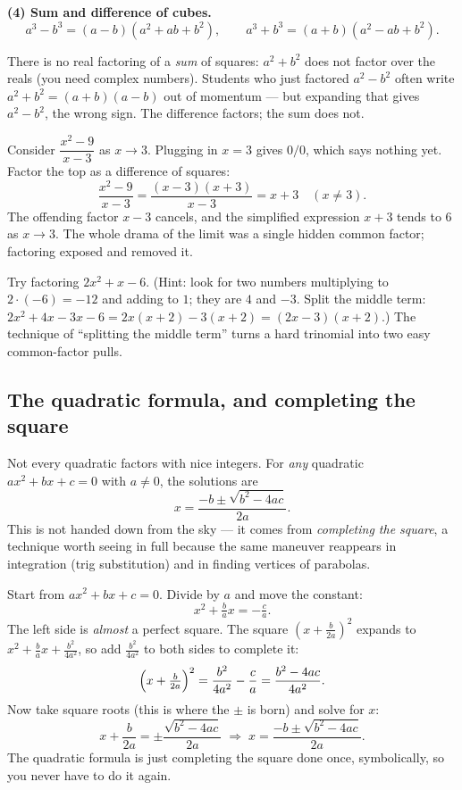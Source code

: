 \textbf{(4) Sum and difference of cubes.}
\[
  a^3 - b^3 = (a-b)(a^2 + ab + b^2), \qquad
  a^3 + b^3 = (a+b)(a^2 - ab + b^2).
\]

\begin{trapbox}
There is no real factoring of a \emph{sum} of squares: $a^2 + b^2$ does not factor
over the reals (you need complex numbers). Students who just factored $a^2 - b^2$
often write $a^2+b^2 = (a+b)(a-b)$ out of momentum --- but expanding that gives
$a^2 - b^2$, the wrong sign. The difference factors; the sum does not.
\end{trapbox}

\begin{example}
\label{ch40:ex-factor-limit}
Consider $\dfrac{x^2 - 9}{x - 3}$ as $x \to 3$. Plugging in $x=3$ gives $0/0$,
which says nothing yet. Factor the top as a difference of squares:
\[
  \frac{x^2 - 9}{x-3} = \frac{(x-3)(x+3)}{x-3} = x + 3 \quad (x \neq 3).
\]
The offending factor $x-3$ cancels, and the simplified expression $x+3$ tends to
$6$ as $x \to 3$. The whole drama of the limit was a single hidden common factor;
factoring exposed and removed it.
\end{example}

\begin{walkbox}
Try factoring $2x^2 + x - 6$. (Hint: look for two numbers multiplying to
$2\cdot(-6) = -12$ and adding to $1$; they are $4$ and $-3$. Split the middle term:
$2x^2 + 4x - 3x - 6 = 2x(x+2) - 3(x+2) = (2x-3)(x+2)$.) The technique of
``splitting the middle term'' turns a hard trinomial into two easy common-factor
pulls.
\end{walkbox}

\subsection{The quadratic formula, and completing the square}

Not every quadratic factors with nice integers. For \emph{any} quadratic
$ax^2 + bx + c = 0$ with $a \neq 0$, the solutions are
\[
  x = \frac{-b \pm \sqrt{b^2 - 4ac}}{2a}.
\]
This is not handed down from the sky --- it comes from \emph{completing the
square}, a technique worth seeing in full because the same maneuver reappears in
integration (trig substitution) and in finding vertices of parabolas.

\begin{whybox}
Start from $ax^2 + bx + c = 0$. Divide by $a$ and move the constant:
\[
  x^2 + \tfrac{b}{a}x = -\tfrac{c}{a}.
\]
The left side is \emph{almost} a perfect square. The square $(x + \tfrac{b}{2a})^2$
expands to $x^2 + \tfrac{b}{a}x + \tfrac{b^2}{4a^2}$, so add $\tfrac{b^2}{4a^2}$ to
both sides to complete it:
\[
  \Bigl(x + \tfrac{b}{2a}\Bigr)^2 = \frac{b^2}{4a^2} - \frac{c}{a}
                                  = \frac{b^2 - 4ac}{4a^2}.
\]
Now take square roots (this is where the $\pm$ is born) and solve for $x$:
\[
  x + \frac{b}{2a} = \pm\frac{\sqrt{b^2-4ac}}{2a}
  \;\Longrightarrow\;
  x = \frac{-b \pm \sqrt{b^2-4ac}}{2a}.
\]
The quadratic formula is just completing the square done once, symbolically, so
you never have to do it again.
\end{whybox}


